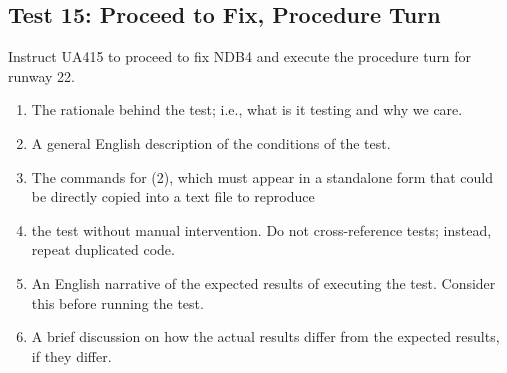 \documentclass[letterpaper, 12pt]{article}
\begin{document}
\subsection{Test 15: Proceed to Fix, Procedure Turn}
Instruct UA415 to proceed to fix NDB4 and execute the procedure turn for runway 22.
\begin{enumerate}
\item The rationale behind the test; i.e., what is it testing and why we care.
\item A general English description of the conditions of the test.
\item The commands for (2), which must appear in a standalone form that could be directly copied into a text file to reproduce
\item the test without manual intervention. Do not cross-reference tests; instead, repeat duplicated code.
\item An English narrative of the expected results of executing the test. Consider this before running the test.
\item A brief discussion on how the actual results differ from the expected results, if they differ.
\end{enumerate}
\end{document}

